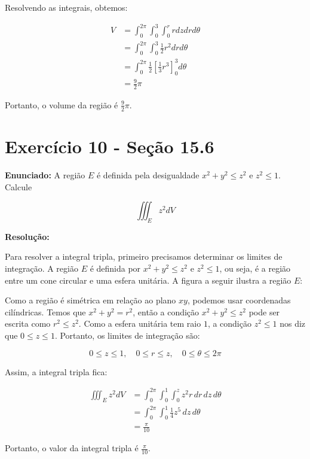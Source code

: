 \documentclass{article}
\begin{document}
Resolvendo as integrais, obtemos:

\begin{align*}
V &= \int_0^{2\pi} \int_0^3 \int_0^r r dz dr d\theta \\
&= \int_0^{2\pi} \int_0^3 \frac{1}{2}r^2 dr d\theta \\
&= \int_0^{2\pi} \frac{1}{2} \left[ \frac{1}{3}r^3 \right]_0^3 d\theta \\
&= \frac{9}{2}\pi
\end{align*}

Portanto, o volume da região é $\frac{9}{2}\pi$.

\newpage

\section*{Exercício 10 - Seção 15.6}
\textbf{Enunciado:} A região $E$ é definida pela desigualdade $x^2 + y^2 \leq z^2$ e $z^2 \leq 1$. Calcule

$$\iiint_E z^2 dV$$

\textbf{Resolução:}

Para resolver a integral tripla, primeiro precisamos determinar os limites de integração. A região $E$ é definida por $x^2 + y^2 \leq z^2$ e $z^2 \leq 1$, ou seja, é a região entre um cone circular e uma esfera unitária. A figura a seguir ilustra a região $E$:

\begin{center}
\end{center}

Como a região é simétrica em relação ao plano $xy$, podemos usar coordenadas cilíndricas. Temos que $x^2 + y^2 = r^2$, então a condição $x^2 + y^2 \leq z^2$ pode ser escrita como $r^2 \leq z^2$. Como a esfera unitária tem raio $1$, a condição $z^2 \leq 1$ nos diz que $0 \leq z \leq 1$. Portanto, os limites de integração são:

$$0 \leq z \leq 1, \quad 0 \leq r \leq z, \quad 0 \leq \theta \leq 2\pi$$

Assim, a integral tripla fica:

\begin{align*}
\iiint_E z^2 dV &= \int_0^{2\pi} \int_0^1 \int_0^z z^2 r\,dr\,dz\,d\theta \\
&= \int_0^{2\pi} \int_0^1 \frac{1}{4}z^5\,dz\,d\theta \\
&= \frac{\pi}{10}
\end{align*}

Portanto, o valor da integral tripla é $\frac{\pi}{10}$.
\end{document}
